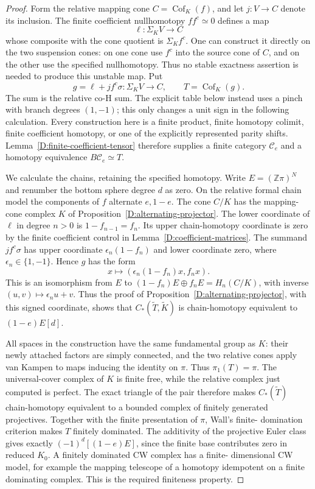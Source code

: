 \begin{proof}
Form the relative mapping cone
$C=\operatorname{Cof}_K(f)$, and let $j:V\to C$ denote its
inclusion.  The finite coefficient nullhomotopy
$ff^c\simeq0$ defines a map
\[
 \ell:\Sigma_K V\longrightarrow C
\]
whose composite with the cone quotient is $\Sigma_Kf^c$.
One can construct it directly on the two suspension cones:
on one cone use $f^c$ into the source cone of $C$, and on the
other use the specified nullhomotopy.  Thus no stable exactness
assertion is needed to produce this unstable map.
Put
\[
 g=\ell+jf^c\sigma:\Sigma_KV\longrightarrow C,
 \qquad T=\operatorname{Cof}_K(g).
\]
The sum is the relative co-H sum. The explicit table below instead
uses a pinch with branch degrees $(1,-1)$; this only changes a unit
sign in the following calculation. Every construction here is
a finite product, finite homotopy colimit, finite coefficient
homotopy, or one of the explicitly represented parity shifts.
Lemma~\ref{D:finite-coefficient-tensor} therefore supplies a
finite category $\mathcal C_e$ and a homotopy equivalence
$B\mathcal C_e\simeq T$.

We calculate the chains, retaining the specified homotopy.
Write $E=(\mathbb Z\pi)^N$ and renumber the bottom sphere degree
$d$ as zero.  On the relative formal chain model the components
of $f$ alternate $e,1-e$.  The cone $C/K$ has the mapping-cone
complex $K$ of Proposition~\ref{D:alternating-projector}.
The lower coordinate of $\ell$ in degree $n>0$ is
$1-f_{n-1}=f_n$.  Its upper chain-homotopy coordinate is zero
by the finite coefficient control in
Lemma~\ref{D:coefficient-matrices}. The summand $jf^c\sigma$ has
upper coordinate $\epsilon_n(1-f_n)$ and lower coordinate zero,
where $\epsilon_n\in\{1,-1\}$. Hence $g$ has the form
\[
 x\longmapsto(\epsilon_n(1-f_n)x,f_nx).
\]
This is an isomorphism from $E$ to
$(1-f_n)E\oplus f_nE=H_n(C/K)$, with inverse
$(u,v)\mapsto\epsilon_nu+v$. Thus the proof of
Proposition~\ref{D:alternating-projector}, with this signed
coordinate, shows that $C_*(\widetilde T,\widetilde K)$ is
chain-homotopy equivalent to $(1-e)E[d]$.

All spaces in the construction have the same fundamental group
as $K$: their newly attached factors are simply connected, and
the two relative cones apply van Kampen to maps inducing the
identity on $\pi$.  Thus $\pi_1(T)=\pi$.
The universal-cover complex of $K$ is finite free, while the
relative complex just computed is perfect.  The exact triangle
of the pair therefore makes $C_*(\widetilde T)$ chain-homotopy
equivalent to a bounded complex of finitely generated projectives.
Together with the finite presentation of $\pi$, Wall's finite-
domination criterion \cite{wall1965D} makes $T$ finitely dominated. The
additivity of the projective Euler class gives exactly
$(-1)^d[(1-e)E]$, since the finite base contributes zero in
reduced $K_0$.  A finitely dominated CW complex has a finite-
dimensional CW model, for example the mapping telescope of a
homotopy idempotent on a finite dominating complex.  This is the
required finiteness property.
\end{proof}
